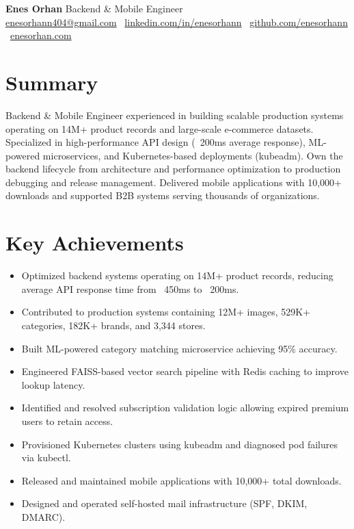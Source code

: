 \documentclass[10pt,a4paper]{extarticle}
\begin{document}
\begin{center}
\begin{minipage}{\textwidth}
\centering
{\LARGE\textbf{Enes Orhan}} \hspace{2pt} {\LARGE{Backend \& Mobile Engineer}}\\[10pt]
\href{mailto:enesorhann404@gmail.com}{enesorhann404@gmail.com} \textbullet\
\href{https://linkedin.com/in/enesorhann}{linkedin.com/in/enesorhann} \textbullet\
\href{https://github.com/enesorhann}{github.com/enesorhann} \textbullet\
\href{https://enesorhan.com}{enesorhan.com}
\end{minipage}
\end{center}

\section{Summary}
Backend \& Mobile Engineer experienced in building scalable production systems operating on 14M+ product records and large-scale e-commerce datasets.
Specialized in high-performance API design (~200ms average response), ML-powered microservices, and Kubernetes-based deployments (kubeadm).
Own the backend lifecycle from architecture and performance optimization to production debugging and release management.
Delivered mobile applications with 10,000+ downloads and supported B2B systems serving thousands of organizations.

\section{Key Achievements}
\begin{itemize}[leftmargin=*,noitemsep,topsep=0pt]
\item Optimized backend systems operating on 14M+ product records, reducing average API response time from ~450ms to ~200ms.
\item Contributed to production systems containing 12M+ images, 529K+ categories, 182K+ brands, and 3,344 stores.
\item Built ML-powered category matching microservice achieving 95\% accuracy.
\item Engineered FAISS-based vector search pipeline with Redis caching to improve lookup latency.
\item Identified and resolved subscription validation logic allowing expired premium users to retain access.
\item Provisioned Kubernetes clusters using kubeadm and diagnosed pod failures via kubectl.
\item Released and maintained mobile applications with 10,000+ total downloads.
\item Designed and operated self-hosted mail infrastructure (SPF, DKIM, DMARC).
\end{itemize}
\end{document}

